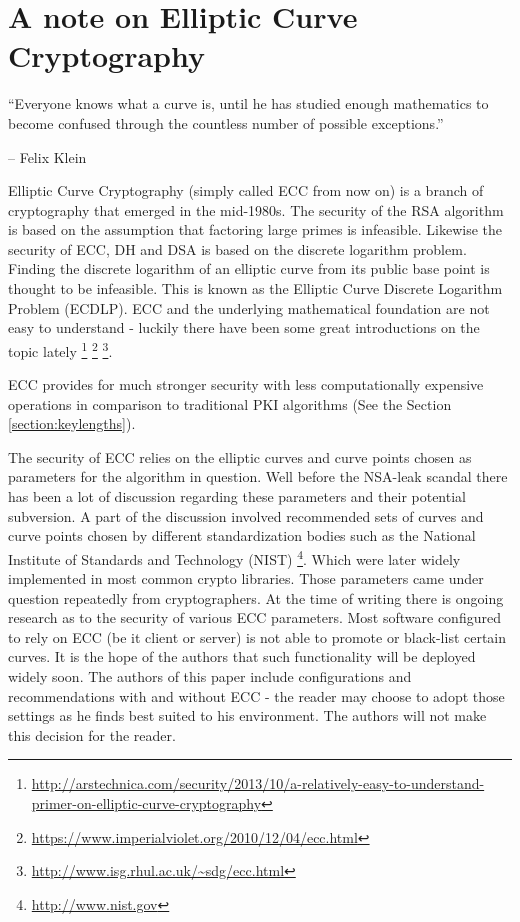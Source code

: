 \section{A note on Elliptic Curve Cryptography}
\label{section:EllipticCurveCryptography}


\epigraph{``Everyone knows what a curve is, until he has studied enough
mathematics to become confused through the countless number of possible
exceptions.''}{-- Felix Klein }

Elliptic Curve Cryptography (simply called ECC from now on) is a branch of
cryptography that emerged in the mid-1980s.  The security of the RSA
algorithm is based on the assumption that factoring large primes is infeasible.
Likewise the security of ECC, DH and DSA is based on the discrete logarithm
problem\cite{Wikipedia:Discrete,McC90,WR13}.  Finding the discrete logarithm of
an elliptic curve from its public base point is thought to be infeasible. This
is known as the Elliptic Curve Discrete Logarithm Problem (ECDLP). ECC and the
underlying mathematical foundation are not easy to understand - luckily there
have been some great introductions on the topic lately
\footnote{\url{http://arstechnica.com/security/2013/10/a-relatively-easy-to-understand-primer-on-elliptic-curve-cryptography}}
\footnote{\url{https://www.imperialviolet.org/2010/12/04/ecc.html}}
\footnote{\url{http://www.isg.rhul.ac.uk/~sdg/ecc.html}}.

ECC provides for much stronger security with less computationally expensive
operations in comparison to traditional PKI algorithms (See the Section
\ref{section:keylengths}).


The security of ECC relies on the elliptic curves and curve points chosen as
parameters for the algorithm in question. Well before the NSA-leak scandal
there has been a lot of discussion regarding these parameters and their
potential subversion. A part of the discussion involved recommended sets of
curves and curve points chosen by different standardization bodies such as the
National Institute of Standards and Technology (NIST)
\footnote{\url{http://www.nist.gov}}. Which were later widely implemented in
most common crypto libraries. Those parameters came under question repeatedly
from cryptographers\cite{BL13,Sch13b,W13}.  At the time of writing there is
ongoing research as to the security of various ECC parameters\cite{DJBSC}.
Most software configured to rely on ECC (be it client or server) is not able to
promote or black-list certain curves. It is the hope of the authors that such
functionality will be deployed widely soon.  The authors of this paper include
configurations and recommendations with and without ECC - the reader may choose
to adopt those settings as he finds best suited to his environment. The authors
will not make this decision for the reader.


